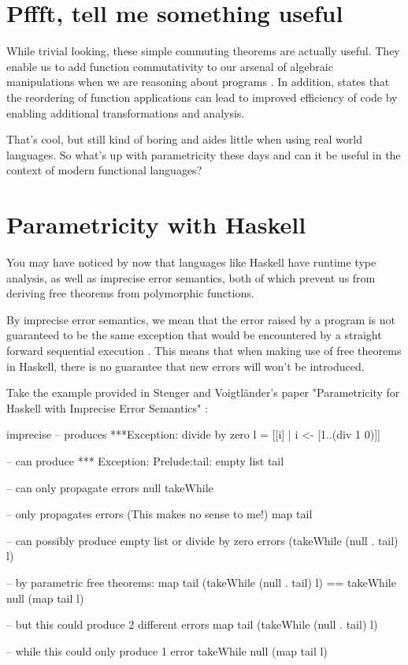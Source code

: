 \section{Pffft, tell me something useful}
While trivial looking, these simple commuting theorems are actually useful. They enable us to add function commutativity to our arsenal of algebraic manipulations when we are reasoning about programs \cite{theoremsForFree}. In addition, \cite{impreciseSemantics} states that the reordering of function applications can lead to improved efficiency of code by enabling additional transformations and analysis.

That's cool, but still kind of boring and aides little when using real world languages. So what's up with parametricity these days and can it be useful in the context of modern functional languages?

\section{Parametricity with Haskell}
You may have noticed by now that languages like Haskell have runtime type analysis, as well as imprecise error semantics, both of which prevent us from deriving free theorems from polymorphic functions.

By imprecise error semantics, we mean that the error raised by a program is not guaranteed to be the same exception that would be encountered by a straight forward sequential execution \cite{jonesSemantics}. This means that when making use of free theorems in Haskell, there is no guarantee that new errors will won't be introduced.

Take the example provided in Stenger and Voigtländer's paper "Parametricity for Haskell with Imprecise Error Semantics" \cite{impreciseSemantics}:
\begin{SaveVerbatim}{imprecise}
-- produces ***Exception: divide by zero
l = [[i] | i <- [1..(div 1 0)]]

-- can produce *** Exception: Prelude:tail: empty list
tail

-- can only propagate errors
null
takeWhile

-- only propagates errors (This makes no sense to me!)
map tail

-- can possibly produce empty list or divide by zero errors
(takeWhile (null . tail) l)

-- by parametric free theorems:
map tail (takeWhile (null . tail) l) == 
takeWhile null (map tail l)

-- but this could produce 2 different errors
map tail (takeWhile (null . tail) l)

-- while this could only produce 1 error
takeWhile null (map tail l)
\end{SaveVerbatim}


